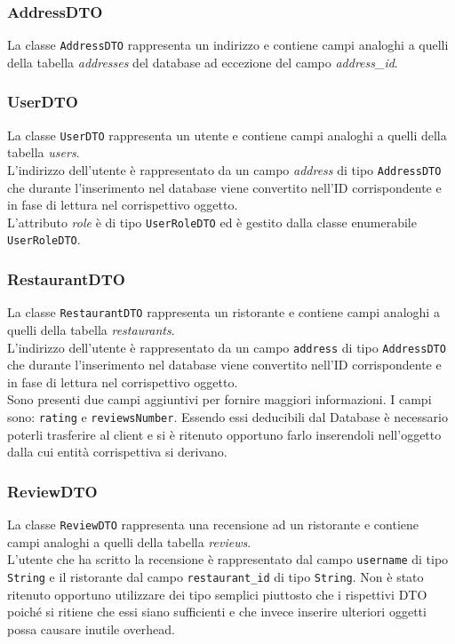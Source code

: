 \subsubsection{AddressDTO}
\label{sec:addressdto}
La classe \texttt{AddressDTO} rappresenta un indirizzo
e contiene campi analoghi a quelli della tabella
\textit{addresses} del database ad eccezione del campo
\textit{address\_id}.

\subsubsection{UserDTO}
\label{sec:userdto}
La classe \texttt{UserDTO} rappresenta un utente
e contiene campi analoghi a quelli della tabella
\textit{users}.\\
L'indirizzo dell'utente è rappresentato da un campo
\textit{address} di tipo \texttt{AddressDTO} che durante 
l'inserimento nel database viene convertito nell'ID corrispondente 
e in fase di lettura nel corrispettivo oggetto.\\
L'attributo \textit{role} è di tipo \texttt{UserRoleDTO} ed è 
gestito dalla classe enumerabile \texttt{UserRoleDTO}.

\subsubsection{RestaurantDTO}
\label{sec:restaurantdto}
La classe \texttt{RestaurantDTO} rappresenta un ristorante
e contiene campi analoghi a quelli della tabella
\textit{restaurants}.\\
L'indirizzo dell'utente è rappresentato da un campo
\texttt{address} di tipo \texttt{AddressDTO} che durante 
l'inserimento nel database viene convertito nell'ID corrispondente 
e in fase di lettura nel corrispettivo oggetto.\\
Sono presenti due campi aggiuntivi per fornire maggiori 
informazioni. I campi sono: \texttt{rating} e 
\texttt{reviewsNumber}. Essendo essi deducibili dal Database è 
necessario poterli trasferire al client e si è ritenuto opportuno 
farlo inserendoli nell'oggetto dalla cui entità corrispettiva si 
derivano.\\

\subsubsection{ReviewDTO}
\label{sec:reviewdto}
La classe \texttt{ReviewDTO} rappresenta una recensione ad un 
ristorante e contiene campi analoghi a quelli della tabella
\textit{reviews}.\\
L'utente che ha scritto la recensione è rappresentato dal campo 
\texttt{username} di tipo \texttt{String} e il ristorante dal campo 
\texttt{restaurant\_id} di tipo \texttt{String}.
Non è stato ritenuto opportuno utilizzare dei tipo semplici piuttosto
che i rispettivi DTO poiché si ritiene che essi siano sufficienti e 
che invece inserire ulteriori oggetti possa causare inutile overhead.\\

